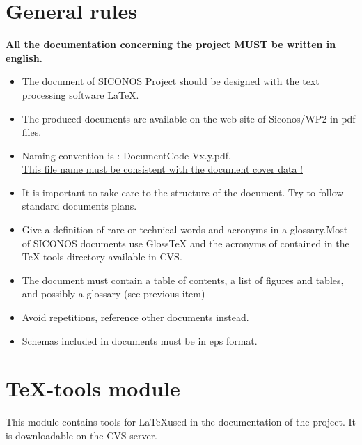 \documentclass[a4paper,twoside,openright,makeidx,12pt]{report}
\begin{document}
\section{General rules}

\textbf{All the documentation concerning the project MUST be written in english.}

\begin{itemize}
\item The document of SICONOS Project should be designed with the text processing software \LaTeX.
\item The produced documents are available on the web site of Siconos/WP2 in pdf files.
\item Naming convention is : DocumentCode-Vx.y.pdf.\\ \underline{This file name must be consistent with the document cover data !}
\item It is important to take care to the structure of the document. Try to follow standard documents plans.
\item Give a definition of rare or technical words and acronyms in a glossary.Most of SICONOS documents use GlossTeX and the acronyms of contained in the TeX-tools directory available in CVS.%
\item The document must contain a table of contents, a list of figures and tables, and possibly a glossary (see previous item)
\item Avoid repetitions, reference other documents instead.
\item Schemas included in documents must be in eps format.
\end{itemize}

\section{TeX-tools module}

This module contains tools for \LaTeX used in the documentation of the project. It is downloadable on the CVS server.


\newpage
\end{document}

